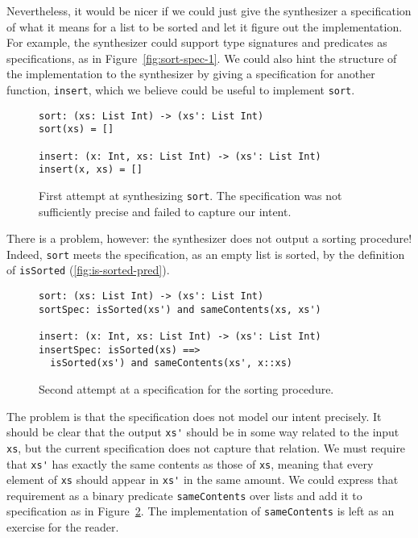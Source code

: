 Nevertheless, it would be nicer if we could just give the synthesizer a
specification of what it means for a list to be sorted and let it figure out the
implementation. For example, the synthesizer could support type signatures and
predicates as specifications, as in Figure~\ref{fig:sort-spec-1}. We could also
hint the structure of the implementation to the synthesizer by giving a
specification for another function, \verb|insert|, which we believe could be
useful to implement \verb|sort|.

\begin{figure}[h!]
  \centering
\begin{verbatim}
sort: (xs: List Int) -> (xs': List Int)
sort(xs) = []

insert: (x: Int, xs: List Int) -> (xs': List Int)
insert(x, xs) = []
\end{verbatim}
  \cprotect\caption{First attempt at synthesizing \verb|sort|. The specification
    was not sufficiently precise and failed to capture our intent.}
  \label{fig:sort-synth-1}
\end{figure}

There is a problem, however: the synthesizer does not output a sorting
procedure! Indeed, \verb|sort| meets the specification, as an empty list is
sorted, by the definition of \verb|isSorted| (\ref{fig:is-sorted-pred}).

\begin{figure}[h!]
  \centering
\begin{verbatim}
sort: (xs: List Int) -> (xs': List Int)
sortSpec: isSorted(xs') and sameContents(xs, xs')

insert: (x: Int, xs: List Int) -> (xs': List Int)
insertSpec: isSorted(xs) ==>
  isSorted(xs') and sameContents(xs', x::xs)
\end{verbatim}
  \caption{Second attempt at a specification for the sorting procedure.}
  \label{fig:sort-spec-2}
\end{figure}

The problem is that the specification does not model our intent precisely. It
should be clear that the output \verb|xs'| should be in some way related to the
input \verb|xs|, but the current specification does not capture that relation.
We must require that \verb|xs'| has exactly the same contents as those of
\verb|xs|, meaning that every element of \verb|xs| should appear in \verb|xs'|
in the same amount. We could express that requirement as a binary predicate
\verb|sameContents| over lists and add it to specification as in
Figure~\ref{fig:sort-spec-2}. The implementation of \verb|sameContents| is left
as an exercise for the reader.

